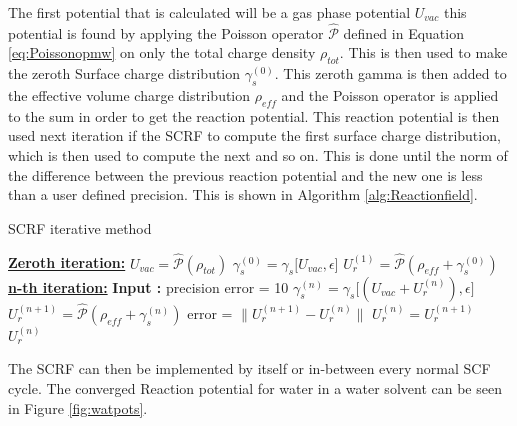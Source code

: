 \documentclass[../master_thesis.tex]{subfiles}
\begin{document}
The first potential that is calculated will be a gas phase potential $U_{vac}$ this
potential is found by applying the Poisson operator $\hat{\mathscr{P}}$ defined
in Equation \ref{eq:Poissonopmw} on only the total charge density $\rho_{tot}$.
This is then used to make the zeroth Surface charge distribution $\gamma_s^{(0)}$.
This zeroth gamma is then added to the effective volume charge distribution $\rho_{eff}$
and the Poisson operator is applied to the sum in order to get the reaction potential.
This reaction potential is then used next iteration if the \ac{SCRF} to compute
the first surface charge distribution, which is then used to compute the next
and so on. This is done until the norm of the difference between the previous
reaction potential and the new one is less than a user defined precision. This is shown in
Algorithm \ref{alg:Reactionfield}.
\begin{algorithm}
  \caption{\ac{SCRF} iterative method}\label{alg:Reactionfield}
  \begin{algorithmic}
    \STATE \underline{\textbf{Zeroth iteration:}}
    \STATE $U_{vac} = \hat{\mathscr{P}}(\rho_{tot})$
    \STATE $\gamma_s^{(0)} = \gamma_s\big[U_{vac}, \epsilon\big]$
    \STATE $U_r^{(1)} = \hat{\mathscr{P}}(\rho_{eff} + \gamma_s^{(0)})$
    \STATE \underline{\textbf{n-th iteration:}}
    \STATE \textbf{Input :} precision
    \STATE error = 10
      \STATE $\gamma_s^{(n)} = \gamma_s\big[(U_{vac}+ U_r^{(n)}), \epsilon\big]$
      \STATE $U_r^{(n+1)} = \hat{\mathscr{P}} (\rho_{eff} + \gamma_s^{(n)})$
      \STATE error = $\lVert U_r^{(n+1)} - U_r^{(n)} \rVert$
      \STATE $U_r^{(n)} = U_r^{(n+1)}$
    \ENDWHILE
    \RETURN $U_r^{(n)}$
  \end{algorithmic}
\end{algorithm}
The \ac{SCRF} can then be implemented by itself or in-between every normal
\ac{SCF} cycle. The converged Reaction potential for water in a water solvent
can be seen in Figure \ref{fig:watpots}.
\end{document}
